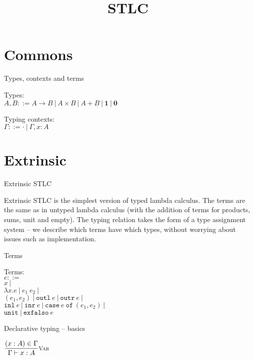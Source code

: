 \documentclass{beamer}
\title{STLC}
\newcommand{\pipe}{\ |\ }
\newcommand{\Fun}[2]{#1 \to #2}
\newcommand{\Prod}[2]{#1 \times #2}
\newcommand{\Sum}[2]{#1 + #2}
\newcommand{\Unit}{\textbf{1}}
\newcommand{\Empty}{\textbf{0}}
\newcommand{\fun}[2]{\lambda #1. #2}
\newcommand{\app}[2]{#1\ #2}
\newcommand{\pair}[2]{(#1, #2)}
\newcommand{\outl}[1][]{\texttt{outl}\ #1}
\newcommand{\outr}[1][]{\texttt{outr}\ #1}
\newcommand{\inl}[1][]{\texttt{inl}\ #1}
\newcommand{\inr}[1][]{\texttt{inr}\ #1}
\newcommand{\case}[3]{\texttt{case}\ #1\ \texttt{of}\ (#2, #3)}
\newcommand{\unit}{\texttt{unit}}
\newcommand{\exfalso}[1][]{\texttt{exfalso}\ #1}
\newcommand{\fulltyping}[3]{#1 \vdash #2 : #3}
\newcommand{\typing}[2]{\fulltyping{\Gamma}{#1}{#2}}
\newcommand{\infrule}[3][]{\displaystyle \frac{#2}{#3} \textsc{\footnotesize{#1}}}
\newcommand{\emptytypingctx}{\cdot}
\newcommand{\extend}[3]{#1, #2 : #3}
\newcommand{\sidecond}[1]{#1}
\begin{document}
\section{Commons}

\begin{frame}{Types, contexts and terms}

Types: \\
$A, B ::= \Fun{A}{B} \pipe \Prod{A}{B} \pipe \Sum{A}{B} \pipe \Unit \pipe \Empty$

\vspace{2em}

Typing contexts: \\
$\Gamma ::= \emptytypingctx \pipe \extend{\Gamma}{x}{A}$

\end{frame}

\section{Extrinsic}

\begin{frame}{Extrinsic STLC}

Extrinsic STLC is the simplest version of typed lambda calculus. The terms are the same as in untyped lambda calculus (with the addition of terms for products, sums, unit and empty). The typing relation takes the form of a type assignment system -- we describe which terms have which types, without worrying about issues such as implementation.

\end{frame}

\begin{frame}{Terms}

Terms: \\
$e ::=$ \\
\qquad $x \pipe$ \\
\qquad $\fun{x}{e} \pipe \app{e_1}{e_2} \pipe$ \\
\qquad $\pair{e_1}{e_2} \pipe \outl[e] \pipe \outr[e] \pipe$ \\
\qquad $\inl[e] \pipe \inr[e] \pipe \case{e}{e_1}{e_2} \pipe$ \\
\qquad $\unit \pipe \exfalso{e}$

\end{frame}

\begin{frame}{Declarative typing -- basics}

\begin{center}
  $\infrule[Var]{\sidecond{(x : A) \in \Gamma}}{\typing{x}{A}}$
\end{center}

\end{frame}
\end{document}
